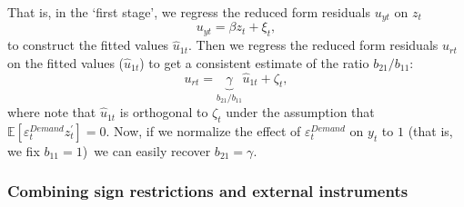 \documentclass[10pt]{article}
\begin{document}
That is, in the `first stage', we regress the reduced form residuals $u_{yt}$
on $z_{t}$%
\begin{equation}
u_{yt}=\beta z_{t}+\xi _{t},  \label{eqapp:first_stage}
\end{equation}%
to construct the fitted values $\hat{u}_{1t}$. Then we regress the reduced
form residuals $u_{rt}$ on the fitted values ($\hat{u}_{1t}$) to get a
consistent estimate of the ratio $b_{21}/b_{11}$:%
\begin{equation}
u_{rt}=\underset{b_{21}/b_{11}}{\underbrace{\gamma }}\hat{u}_{1t}+\zeta _{t},
\label{eqapp:second_stage}
\end{equation}%
where note that $\hat{u}_{1t}$ is orthogonal to $\zeta _{t}$ under the
assumption that $\mathbb{E}[\varepsilon _{t}^{Demand}z_{t}^{\prime }]=0$.
Now, if we normalize the effect of $\varepsilon _{t}^{Demand}$ on $y_{t}$ to
$1$ (that is, we fix $b_{11}=1$)\ we can easily recover $b_{21}=\gamma $.

\subsubsection{Combining sign restrictions and external instruments}
\end{document}
